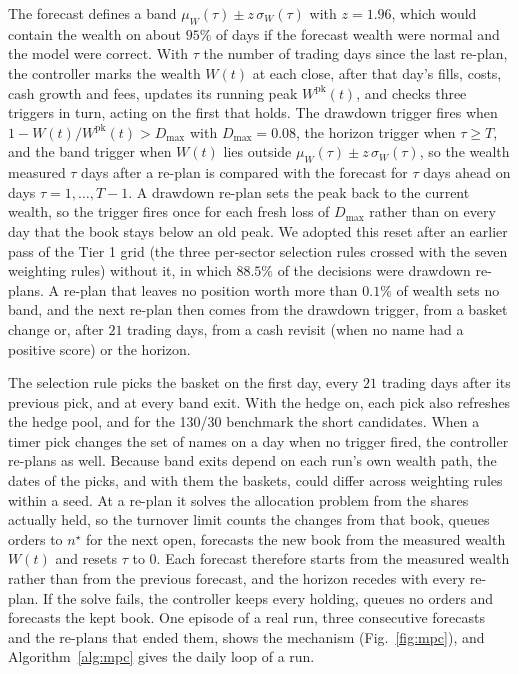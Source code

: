 The forecast defines a band $\mu_W(\tau) \pm z\,\sigma_W(\tau)$ with $z = 1.96$, which would contain the wealth on
about $95\%$ of days if the forecast wealth were normal and the model were correct. With $\tau$ the number of trading
days since the last re-plan, the controller marks the wealth $W(t)$ at each close, after that day's fills, costs,
cash growth and fees, updates its running peak $W^{\mathrm{pk}}(t)$, and checks three triggers in turn, acting on
the first that holds. The drawdown trigger fires when $1 - W(t)/W^{\mathrm{pk}}(t) > D_{\max}$ with $D_{\max} = 0.08$, the horizon
trigger when $\tau \ge T$, and the band trigger when $W(t)$ lies outside $\mu_W(\tau) \pm z\,\sigma_W(\tau)$, so the
wealth measured $\tau$ days after a re-plan is compared with the forecast for $\tau$ days ahead on days
$\tau = 1, \dots, T-1$. A drawdown re-plan sets the peak back to the current wealth, so the trigger fires once for
each fresh loss of $D_{\max}$ rather than on every day that the book stays below an old peak.
We adopted this reset after an earlier pass of the Tier 1 grid (the three per-sector selection rules crossed with
the seven weighting rules) without it, in which $88.5\%$ of the decisions were
drawdown re-plans. A re-plan that leaves no position worth more than $0.1\%$ of wealth sets no band, and the next
re-plan then comes from the drawdown trigger, from a basket change or, after $21$ trading days, from a cash revisit
(when no name had a positive score) or the horizon.

The selection rule picks the basket on the first day, every $21$ trading days after its previous pick, and at
every band exit. With the hedge on, each pick also refreshes the hedge pool, and for the 130/30 benchmark the short
candidates. When a timer pick changes the set of names on a day when no trigger fired, the controller re-plans as
well. Because band exits depend on each run's own wealth path, the dates of the picks, and with them the
baskets, could differ across weighting rules within a seed. At a re-plan it solves the allocation problem from the shares actually held, so the turnover limit counts
the changes from that book, queues orders to $n^\star$ for the next open, forecasts the new book from the measured
wealth $W(t)$ and resets $\tau$ to $0$. Each forecast therefore starts from the measured wealth rather than from
the previous forecast, and the horizon recedes with every re-plan. If the solve fails, the controller keeps every
holding, queues no orders and forecasts the kept book. One episode of a real run, three consecutive forecasts and
the re-plans that ended them, shows the mechanism (Fig.~\ref{fig:mpc}), and Algorithm~\ref{alg:mpc} gives the daily
loop of a run.

